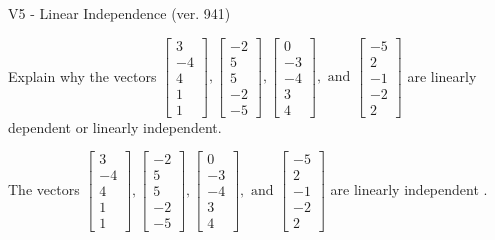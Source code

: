 \begin{exercise}
  \begin{exerciseTitle}V5 - Linear Independence (ver. 941)\end{exerciseTitle}
  \begin{exerciseStatement}
    Explain why the vectors \(\left[\begin{array}{r}
3 \\
-4 \\
4 \\
1 \\
1
\end{array}\right] , \left[\begin{array}{r}
-2 \\
5 \\
5 \\
-2 \\
-5
\end{array}\right] , \left[\begin{array}{r}
0 \\
-3 \\
-4 \\
3 \\
4
\end{array}\right] , \text{ and } \left[\begin{array}{r}
-5 \\
2 \\
-1 \\
-2 \\
2
\end{array}\right]\) are linearly dependent or linearly independent.	


  \end{exerciseStatement}
  \begin{exerciseAnswer}
   The vectors \(\left[\begin{array}{r}
3 \\
-4 \\
4 \\
1 \\
1
\end{array}\right] , \left[\begin{array}{r}
-2 \\
5 \\
5 \\
-2 \\
-5
\end{array}\right] , \left[\begin{array}{r}
0 \\
-3 \\
-4 \\
3 \\
4
\end{array}\right] , \text{ and } \left[\begin{array}{r}
-5 \\
2 \\
-1 \\
-2 \\
2
\end{array}\right]\) are 
  	 linearly independent  .
  


  \end{exerciseAnswer}
\end{exercise}